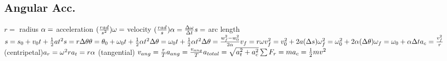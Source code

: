 \documentclass[11pt]{article}
\begin{document}
\begin{paracol}{3}
        \section*{Angular Acc.}
        \begin{fleqn}
            $
            r = $ radius $ \newline
            \alpha = $ acceleration $ (\frac{rad}{s^2}) \newline
            \omega = $ velocity $ (\frac{rad}{s}) \newline
            \alpha = \frac{\Delta \omega}{\Delta t} \newline
            s = $ arc length $ \newline
            s=s_0 + v_0t + \frac{1}{2}at^2 \newline
            s = r \Delta \theta \newline
            \theta = \theta_0 + \omega_0 t + \frac{1}{2}\alpha t^2  \newline
            \Delta \theta = \omega_0 t + \frac{1}{2}\alpha t^2  \newline
            \Delta \theta = \frac{w^2_f - w^2_0}{2 \alpha} \newline
            v_f = r\omega \newline
            v^2_f = v_0^2+2a(\Delta s)  \newline
            \omega^2_f = \omega_0 ^2 + 2 \alpha (\Delta \theta) \newline
            \omega_f = \omega_0 + \alpha \Delta t  \newline
            a_c = \frac{v^2_f}{r} $ (centripetal)$\newline
            a_r = \omega^{2}r \newline
            a_t = r \alpha $ (tangential) $ \newline
            v_{ang} = \frac{r}{T} \newline
            a_{ang} = \frac{v_{ang}}{T} \newline
            a_{total} = \sqrt{a_t^2+a_c^2} \newline
            \sum F_r = ma_c = \frac{1}{2}mv^2
            $
        \end{fleqn}
        \switchcolumn

\end{paracol}
\end{document}
